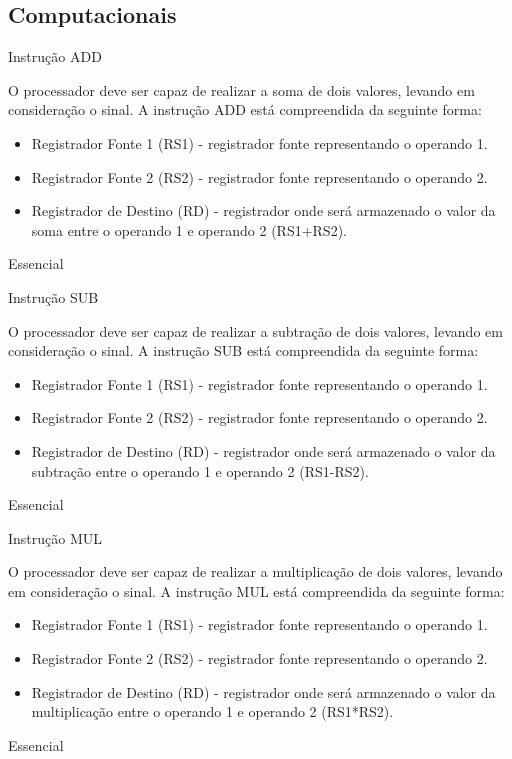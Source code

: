 \documentclass{article}
\begin{document}
    \subsection{Computacionais}
    \begin{functional}

     \requirement
      {Instrução ADD}
      {O processador deve ser capaz de realizar a soma de dois valores, levando em consideração o sinal.
      A instrução ADD está compreendida da seguinte forma:\\
       \begin{itemize}
        \item Registrador Fonte 1 (RS1) - registrador fonte representando o operando 1.
        \item Registrador Fonte 2 (RS2) - registrador fonte representando o operando 2.
        \item Registrador de Destino (RD) - registrador onde será armazenado o valor da soma entre o operando 1 e operando 2 (RS1+RS2).
       \end{itemize}
       }
      {Essencial}

     \requirement
      {Instrução SUB}
      {O processador deve ser capaz de realizar a subtração de dois valores, levando em consideração o sinal.
      A instrução SUB está compreendida da seguinte forma:\\
       \begin{itemize}
        \item Registrador Fonte 1 (RS1) - registrador fonte representando o operando 1.
        \item Registrador Fonte 2 (RS2) - registrador fonte representando o operando 2.
        \item Registrador de Destino (RD) - registrador onde será armazenado o valor da subtração entre o operando 1 e operando 2 (RS1-RS2).
       \end{itemize}
       }
      {Essencial}

      \requirement
      {Instrução MUL}
      {O processador deve ser capaz de realizar a multiplicação de dois valores, levando em consideração o sinal.
      A instrução MUL está compreendida da seguinte forma:\\
       \begin{itemize}
        \item Registrador Fonte 1 (RS1) - registrador fonte representando o operando 1.
        \item Registrador Fonte 2 (RS2) - registrador fonte representando o operando 2.
        \item Registrador de Destino (RD) - registrador onde será armazenado o valor da multiplicação entre o operando 1 e operando 2 (RS1*RS2).
       \end{itemize}
       }
      {Essencial}


\end{functional}
\end{document}

